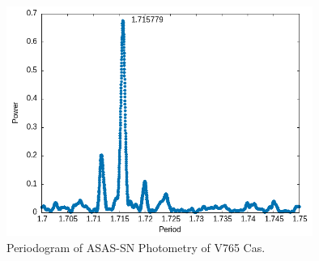 \documentclass[linenumbers]{aastex631}
\begin{document}
\begin{figure}[htb!]
\centering
\includegraphics[width=10cm]{Figures/V765Cas-ASAS-SN-Periodogram.png}
\caption{Periodogram of ASAS-SN Photometry of V765 Cas.} 
\label{fig:asassnperiodogram}
\end{figure}
\end{document}
